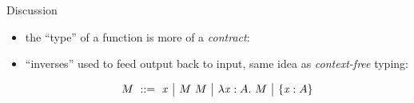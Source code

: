 \begin{frame}{Discussion}
  \begin{itemize}[<+->]
  \item the ``type'' of a function is more of a \emph{contract}:
    \begin{figure}
      \centering
    \end{figure}
  \item ``inverses'' used to feed output back to input, same idea as
    \emph{context-free} typing:

    $$M \gequal \var x \gor \app M M \gor \tlam x A M \gor \{\var x :
    A\} $$
    \begin{mathpar}

    \end{mathpar}

  \end{itemize}
  
\end{frame}

